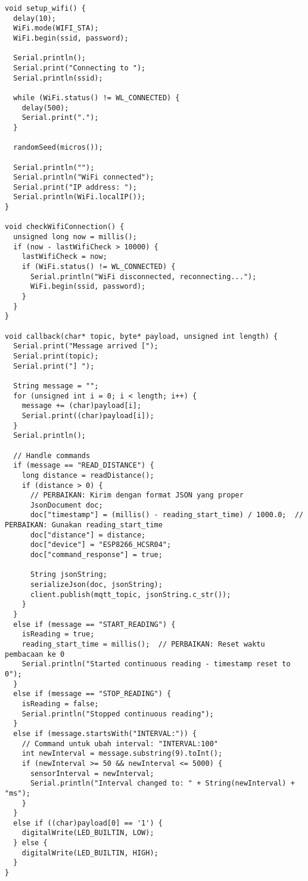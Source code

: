 \begin{itemize}
\begin{scriptsize}
\begin{lstlisting}[language=Arduino]
void setup_wifi() {
  delay(10);
  WiFi.mode(WIFI_STA);
  WiFi.begin(ssid, password);
  
  Serial.println();
  Serial.print("Connecting to ");
  Serial.println(ssid);
  
  while (WiFi.status() != WL_CONNECTED) {
    delay(500);
    Serial.print(".");
  }
  
  randomSeed(micros());
  
  Serial.println("");
  Serial.println("WiFi connected");
  Serial.print("IP address: ");
  Serial.println(WiFi.localIP());
}

void checkWifiConnection() {
  unsigned long now = millis();
  if (now - lastWifiCheck > 10000) {
    lastWifiCheck = now;
    if (WiFi.status() != WL_CONNECTED) {
      Serial.println("WiFi disconnected, reconnecting...");
      WiFi.begin(ssid, password);
    }
  }
}

void callback(char* topic, byte* payload, unsigned int length) {
  Serial.print("Message arrived [");
  Serial.print(topic);
  Serial.print("] ");
  
  String message = "";
  for (unsigned int i = 0; i < length; i++) {
    message += (char)payload[i];
    Serial.print((char)payload[i]);
  }
  Serial.println();

  // Handle commands
  if (message == "READ_DISTANCE") {
    long distance = readDistance();
    if (distance > 0) {
      // PERBAIKAN: Kirim dengan format JSON yang proper
      JsonDocument doc;
      doc["timestamp"] = (millis() - reading_start_time) / 1000.0;  // PERBAIKAN: Gunakan reading_start_time
      doc["distance"] = distance;
      doc["device"] = "ESP8266_HCSR04";
      doc["command_response"] = true;
      
      String jsonString;
      serializeJson(doc, jsonString);
      client.publish(mqtt_topic, jsonString.c_str());
    }
  }
  else if (message == "START_READING") {
    isReading = true;
    reading_start_time = millis();  // PERBAIKAN: Reset waktu pembacaan ke 0
    Serial.println("Started continuous reading - timestamp reset to 0");
  }
  else if (message == "STOP_READING") {
    isReading = false;
    Serial.println("Stopped continuous reading");
  }
  else if (message.startsWith("INTERVAL:")) {
    // Command untuk ubah interval: "INTERVAL:100"
    int newInterval = message.substring(9).toInt();
    if (newInterval >= 50 && newInterval <= 5000) {
      sensorInterval = newInterval;
      Serial.println("Interval changed to: " + String(newInterval) + "ms");
    }
  }
  else if ((char)payload[0] == '1') {
    digitalWrite(LED_BUILTIN, LOW);
  } else {
    digitalWrite(LED_BUILTIN, HIGH);
  }
}


\end{lstlisting}
\end{scriptsize}
\end{itemize}
